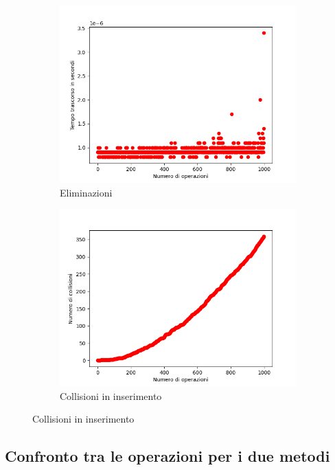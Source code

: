 \documentclass{article}
\begin{document}
\begin{figure}[h]
\begin{subfigure}{0.49\textwidth}
					\includegraphics[width = \textwidth]{HMM_Deletions}
					\caption{Eliminazioni}
				\end{subfigure}
				
				\begin{subfigure}{0.49\textwidth}
					\centering
					\includegraphics[width = \textwidth]{HMM_CollisionsOnInsertions}
					\caption{Collisioni in inserimento}
				\end{subfigure}
				
			\end{figure}
		
		\clearpage
		\subsection{Confronto tra le operazioni per i due metodi}
				
\end{document}
